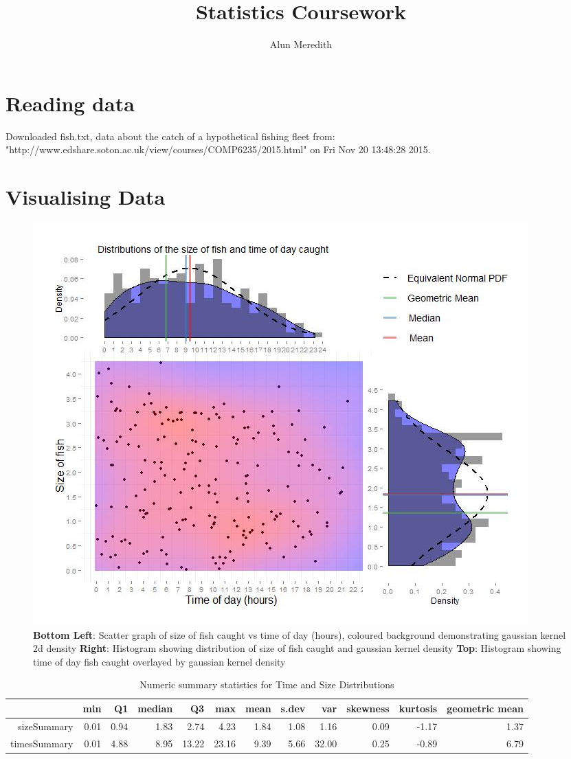 \documentclass{article}\usepackage[]{graphicx}\usepackage[]{color}
\begin{document}
\title{Statistics Coursework}
\author{Alun Meredith}
\maketitle
\section{Reading data}
Downloaded fish.txt, data about the catch of a hypothetical fishing fleet from:\\"http://www.edshare.soton.ac.uk/view/courses/COMP6235/2015.html" on Fri Nov 20 13:48:28 2015. 

\section{Visualising Data}

\begin{figure}[h]
\includegraphics[width=\linewidth]{figure1.jpg}
\caption{\textbf{Bottom Left}: Scatter graph of size of fish caught vs time of day (hours), coloured background demonstrating gaussian kernel 2d density \textbf{Right}: Histogram showing distribution of size of fish caught and gaussian kernel density \textbf{Top}: Histogram showing time of day fish caught overlayed by gaussian kernel density}
\label{fig:1}
\end{figure}
\begin{table}[ht]
\centering
\caption{Numeric summary statistics for Time and Size Distributions} 
\begin{tabular}{rrrrrrrrrrrr}
  \hline
 & min & Q1 & median & Q3 & max & mean & s.dev & var & skewness & kurtosis & geometric mean \\ 
  \hline
sizeSummary & 0.01 & 0.94 & 1.83 & 2.74 & 4.23 & 1.84 & 1.08 & 1.16 & 0.09 & -1.17 & 1.37 \\ 
  timesSummary & 0.01 & 4.88 & 8.95 & 13.22 & 23.16 & 9.39 & 5.66 & 32.00 & 0.25 & -0.89 & 6.79 \\ 
   \hline
\end{tabular}
\end{table}
\end{document}
